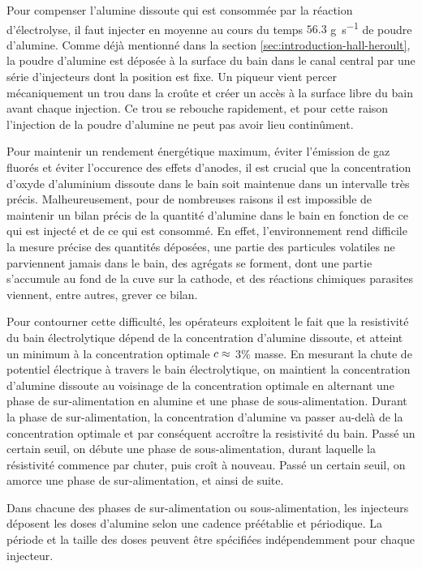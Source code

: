 Pour compenser l'alumine dissoute qui est consommée par la réaction
d'électrolyse, il faut injecter en moyenne au cours du temps $56.3$
\si{\gram\per\second} de poudre d'alumine. Comme déjà mentionné dans
la section \ref{sec:introduction-hall-heroult}, la poudre d'alumine
est déposée à la surface du bain dans le canal central par une série
d'injecteurs dont la position est fixe. Un piqueur vient percer
mécaniquement un trou dans la croûte et créer un accès à la surface
libre du bain avant chaque injection. Ce trou se rebouche rapidement,
et pour cette raison l'injection de la poudre d'alumine ne peut pas
avoir lieu continûment.

Pour maintenir un rendement énergétique maximum, éviter l'émission de
gaz fluorés et éviter l'occurence des effets d'anodes, il est crucial
que la concentration d'oxyde d'aluminium dissoute dans le bain soit
maintenue dans un intervalle très précis. Malheureusement, pour de
nombreuses raisons il est impossible de maintenir un bilan précis de
la quantité d'alumine dans le bain en fonction de ce qui est injecté
et de ce qui est consommé. En effet, l'environnement rend difficile la
mesure précise des quantités déposées, une partie des particules
volatiles ne parviennent jamais dans le bain, des agrégats se forment,
dont une partie s'accumule au fond de la cuve sur la cathode, et des
réactions chimiques parasites viennent, entre autres, grever ce bilan.

Pour contourner cette difficulté, les opérateurs exploitent le fait
que la resistivité du bain électrolytique dépend de la concentration
d'alumine dissoute, et atteint un minimum à la concentration optimale
$c \approx$ \num{3}\% masse. En mesurant la chute de
potentiel électrique à travers le bain électrolytique, on maintient la
concentration d'alumine dissoute au voisinage de la concentration
optimale en alternant une phase de sur-alimentation en alumine et une
phase de sous-alimentation. Durant la phase de sur-alimentation, la
concentration d'alumine va passer au-delà de la concentration optimale
et par conséquent accroître la resistivité du bain. Passé un certain
seuil, on débute une phase de sous-alimentation, durant laquelle la
résistivité commence par chuter, puis croît à nouveau. Passé un
certain seuil, on amorce une phase de sur-alimentation, et ainsi de
suite.

Dans chacune des phases de sur-alimentation ou sous-alimentation, les
injecteurs déposent les doses d'alumine selon une cadence préétablie
et périodique. La période et la taille des doses peuvent être spécifiées
indépendemment pour chaque injecteur.


